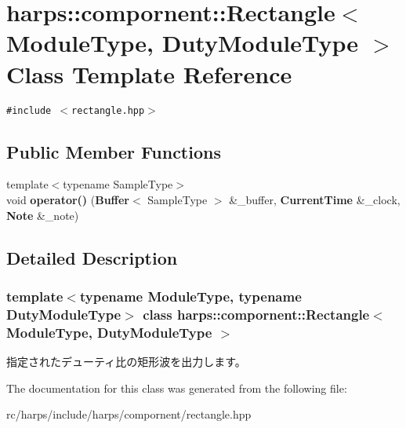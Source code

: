 \section{harps::compornent::Rectangle$<$ ModuleType, DutyModuleType $>$ Class Template Reference}
\label{classharps_1_1compornent_1_1Rectangle}
{\tt \#include $<$rectangle.hpp$>$}

\subsection*{Public Member Functions}
\begin{CompactItemize}
\item 
{\footnotesize template$<$typename SampleType$>$ }\\void \textbf{operator()} ({\bf Buffer}$<$ SampleType $>$ \&\_\-buffer, {\bf CurrentTime} \&\_\-clock, {\bf Note} \&\_\-note)\label{classharps_1_1compornent_1_1Rectangle_c3c3ccda9f7cb778b24f8038590141f2}

\end{CompactItemize}


\subsection{Detailed Description}
\subsubsection*{template$<$typename ModuleType, typename DutyModuleType$>$ class harps::compornent::Rectangle$<$ ModuleType, DutyModuleType $>$}

指定されたデューティ比の矩形波を出力します。 

The documentation for this class was generated from the following file:\begin{CompactItemize}
\item 
rc/harps/include/harps/compornent/rectangle.hpp\end{CompactItemize}
